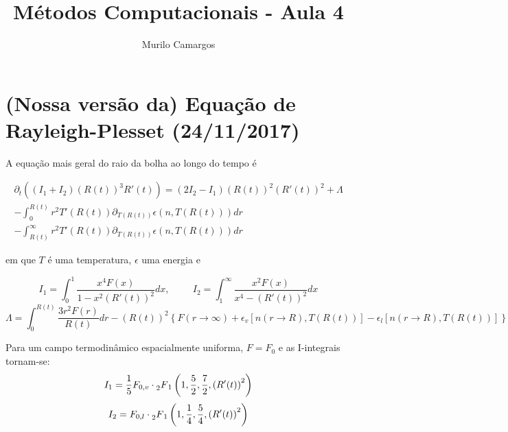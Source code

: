 \documentclass[10pt,a4paper]{article}
\author{Murilo Camargos}
\title{Métodos Computacionais - Aula 4}
\newcommand{\prt}[1]{\left(#1\right)}
\newcommand{\col}[1]{\left[#1\right]}
\newcommand{\chv}[1]{\left\{#1\right\}}
\newcommand{\hgf}[4]{\prescript{}{2}{F}_1\left(#1,#2,#3,#4\right)}
\begin{document}


	\section{(Nossa versão da) Equação de Rayleigh-Plesset (24/11/2017)}
	
	A equação mais geral do raio da bolha ao longo do tempo é
	
	\begin{equation}
	\begin{split}
	\partial_t\prt{\prt{I_1+I_2}\prt{R(t)}^3R'(t)} = \prt{2I_2-I_1}\prt{R(t)}^2\prt{R'(t)}^2 + \Lambda\\ - \int_0^{R(t)}{r^2T'\prt{R(t)}\partial_{T(R(t))}\epsilon\prt{n,T(R(t))}dr}\\ - \int_{R(t)}^\infty{r^2T'\prt{R(t)}\partial_{T(R(t))}\epsilon\prt{n,T(R(t))}dr}
	\end{split}
	\end{equation}
	
	em que $T$ é uma temperatura, $\epsilon$ uma energia e
	
	\[I_1 = \int_0^1{\frac{x^4F(x)}{1-x^2(R'(t))^2}dx}, \hspace{1cm} I_2 = \int_1^\infty{\frac{x^2F(x)}{x^4-(R'(t))^2}dx}\]
	\[\Lambda = \int_0^{R(t)}{\frac{3r^2F(r)}{R(t)}dr} - \prt{R(t)}^2\chv{F(r\rightarrow\infty) + \epsilon_v\col{n(r\rightarrow R), T\prt{R(t)}} - \epsilon_l\col{n(r\rightarrow R), T(R(t))}}\]
	
	Para um campo termodinâmico espacialmente uniforma, $F=F_0$ e as I-integrais tornam-se:
	\[I_1 = \frac{1}{5}F_{0,v}\cdot\hgf{1}{\frac{5}{2}}{\frac{7}{2}}{\prt{R'(t)}^2}\]
	\[I_2 = F_{0,l}\cdot\hgf{1}{\frac{1}{4}}{\frac{5}{4}}{\prt{R'(t)}^2}\]
	
\end{document}
